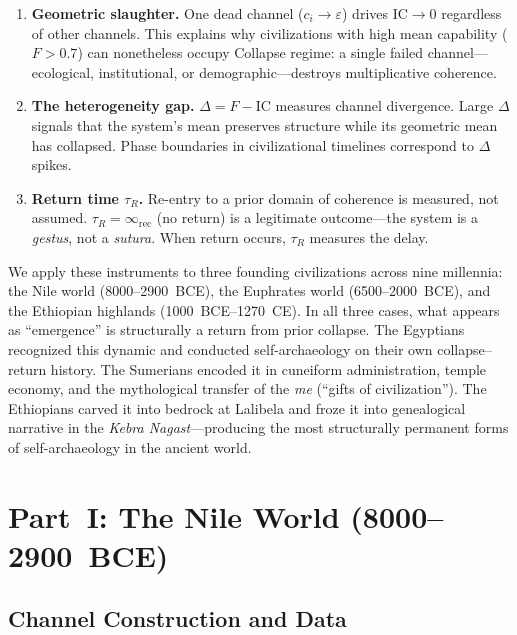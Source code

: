 \documentclass[
  aps,
  prd,
  twocolumn,
  superscriptaddress,
  nofootinbib,
  floatfix
]{revtex4-2}
\newcommand{\tR}{\tau_{\!R}}
\newcommand{\eps}{\varepsilon}
\newcommand{\IR}{\infty_{\mathrm{rec}}}
\newcommand{\IC}{\mathrm{IC}}
\begin{document}
\begin{enumerate}[leftmargin=*]
\item \textbf{Geometric slaughter.}  One dead channel
($c_i \to \eps$) drives $\IC \to 0$ regardless of
other channels.  This explains why civilizations with
high mean capability ($F > 0.7$) can nonetheless
occupy Collapse regime: a single failed
channel---ecological, institutional, or
demographic---destroys multiplicative coherence.

\item \textbf{The heterogeneity gap.}  $\Delta = F -
\IC$ measures channel divergence.  Large $\Delta$
signals that the system's mean preserves structure
while its geometric mean has collapsed.  Phase
boundaries in civilizational timelines correspond to
$\Delta$ spikes.

\item \textbf{Return time $\tR$.}  Re-entry to a
prior domain of coherence is measured, not assumed.
$\tR = \IR$ (no return) is a legitimate
outcome---the system is a \emph{gestus}, not a
\emph{sutura}.  When return occurs, $\tR$ measures
the delay.
\end{enumerate}

We apply these instruments to three founding
civilizations across nine millennia: the Nile world
(8000--2900~BCE), the Euphrates world
(6500--2000~BCE), and the Ethiopian highlands
(1000~BCE--1270~CE).  In all three cases, what
appears as ``emergence'' is structurally a return
from prior collapse.  The Egyptians recognized this
dynamic and conducted self-archaeology on their own
collapse--return history.  The Sumerians encoded it
in cuneiform administration, temple economy, and the
mythological transfer of the \emph{me} (``gifts of
civilization'').  The Ethiopians carved it into
bedrock at Lalibela and froze it into genealogical
narrative in the \emph{Kebra Nagast}---producing
the most structurally permanent forms of
self-archaeology in the ancient world.


\section{Part~I: The Nile World (8000--2900~BCE)}\label{sec:egypt}

\subsection{Channel Construction and Data}\label{sec:data}
\end{document}
